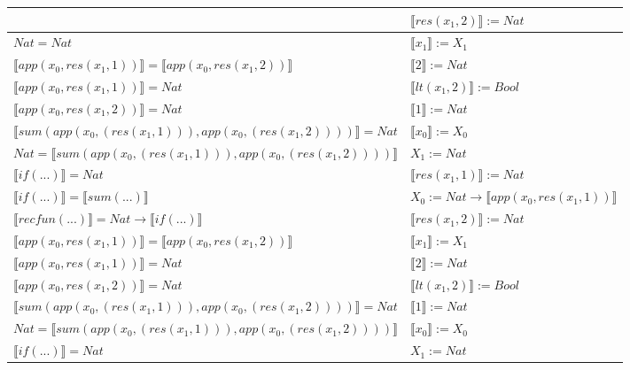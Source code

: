 \begin{exercise}
\begin{description}
\begin{center}
\begin{longtable}[!h]{ | l | l | }
                        & $ \llbracket res(x_1,2) \rrbracket := Nat$ \\
                    \hline
                        $Nat = Nat$ & $ \llbracket x_1 \rrbracket := X_1$\\
		  $ \llbracket app(x_0, res(x_1,1)) \rrbracket =  \llbracket app(x_0, res(x_1,2)) \rrbracket$ & $ \llbracket 2 \rrbracket := Nat$\\
                        $ \llbracket app(x_0, res(x_1,1)) \rrbracket = Nat$ &  $ \llbracket lt(x_1 , 2) \rrbracket := Bool$\\
                        $ \llbracket app(x_0, res(x_1,2)) \rrbracket = Nat$ &  $ \llbracket 1 \rrbracket := Nat$\\
                        $ \llbracket sum(app(x_0, (res(x_1,1))), app(x_0, (res(x_1,2))))  \rrbracket = Nat$ &  $ \llbracket x_0 \rrbracket := X_0$\\
                        $Nat =  \llbracket sum(app(x_0, (res(x_1,1))), app(x_0, (res(x_1,2)))) \rrbracket$ & $X_1 := Nat$\\
                        $ \llbracket if(...) \rrbracket = Nat$ &  $ \llbracket res(x_1,1) \rrbracket := Nat$ \\
                        $ \llbracket if(...) \rrbracket =  \llbracket sum(...) \rrbracket$ & $X_0 := Nat \to  \llbracket app(x_0, res(x_1,1)) \rrbracket$\\
                        $ \llbracket recfun(...) \rrbracket =   Nat  \to  \llbracket if(...) \rrbracket $ & $ \llbracket res(x_1,2) \rrbracket := Nat$ \\
                    \hline
	 	  $ \llbracket app(x_0, res(x_1,1)) \rrbracket =  \llbracket app(x_0, res(x_1,2)) \rrbracket$ &   $ \llbracket x_1 \rrbracket := X_1$\\ 
                        $ \llbracket app(x_0, res(x_1,1)) \rrbracket = Nat$ & $ \llbracket 2 \rrbracket := Nat$\\ 
                        $ \llbracket app(x_0, res(x_1,2)) \rrbracket = Nat$ & $ \llbracket lt(x_1 , 2) \rrbracket := Bool$\\
                        $ \llbracket sum(app(x_0, (res(x_1,1))), app(x_0, (res(x_1,2))))  \rrbracket = Nat$ &    $ \llbracket 1 \rrbracket := Nat$\\ 
                        $Nat =  \llbracket sum(app(x_0, (res(x_1,1))), app(x_0, (res(x_1,2)))) \rrbracket$ &  $ \llbracket x_0 \rrbracket := X_0$\\
                        $ \llbracket if(...) \rrbracket = Nat$ &  $X_1 := Nat$\\ 

\end{longtable}
\end{center}
\end{description}
\end{exercise}
